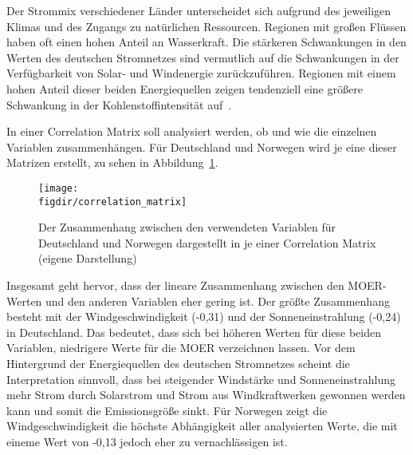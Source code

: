 Der Strommix verschiedener Länder unterscheidet sich aufgrund des jeweiligen Klimas und des Zugangs zu natürlichen Ressourcen.
Regionen mit großen Flüssen haben oft einen hohen Anteil an Wasserkraft.
Die stärkeren Schwankungen in den Werten des deutschen Stromnetzes sind vermutlich auf die Schwankungen in der Verfügbarkeit von Solar- und Windenergie zurückzuführen.
Regionen mit einem hohen Anteil dieser beiden Energiequellen zeigen tendenziell eine größere Schwankung in der Kohlenstoffintensität auf~\cite{Sukprasert.2023}.

In einer Correlation Matrix soll analysiert werden, ob und wie die einzelnen Variablen zusammenhängen.
Für Deutschland und Norwegen wird je eine dieser Matrizen erstellt, zu sehen in Abbildung~\ref{FIG:correlation_matrix}.
\begin{figure}
 \caption{Der Zusammenhang zwischen den verwendeten Variablen für Deutschland und Norwegen dargestellt in je einer Correlation Matrix (eigene Darstellung)}
 {\texttt{[image: \\figdir/correlation\_matrix]}}
 \label{FIG:correlation_matrix}
\end{figure}
Insgesamt geht hervor, dass der lineare Zusammenhang zwischen den \ac{MOER}-Werten und den anderen Variablen eher gering ist.
Der größte Zusammenhang besteht mit der Windgeschwindigkeit (-0,31) und der Sonneneinstrahlung (-0,24) in Deutschland.
Das bedeutet, dass sich bei höheren Werten für diese beiden Variablen, niedrigere Werte für die \ac{MOER} verzeichnen lassen.
Vor dem Hintergrund der Energiequellen des deutschen Stromnetzes scheint die Interpretation sinnvoll, dass bei steigender Windstärke und Sonneneinstrahlung mehr Strom durch Solarstrom und Strom aus Windkraftwerken gewonnen werden kann und somit die Emissionsgröße sinkt.
Für Norwegen zeigt die Windgeschwindigkeit die höchste Abhängigkeit aller analysierten Werte, die mit eineme Wert von -0,13 jedoch eher zu vernachlässigen ist.

